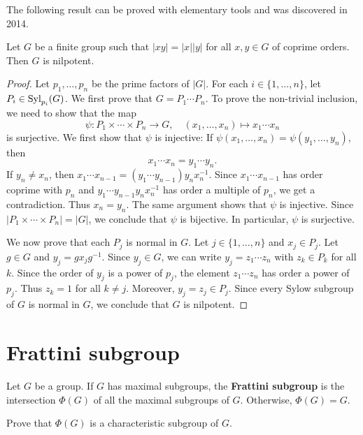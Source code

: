 The following result can be proved with elementary tools 
and was discovered 
in 2014. 

\begin{theorem}
Let $G$ be a finite group such that $|xy|=|x||y|$ for all $x,y\in G$ of coprime orders. 
Then $G$ is nilpotent. 
\end{theorem}

\begin{proof}
Let $p_1,\dots,p_n$ be the prime factors of $|G|$. For 
each 
$i\in\{1,\dots,n\}$, let $P_i\in\mathrm{Syl}_{p_i}(G)$. We first prove that 
$G=P_1\cdots P_n$. To prove the non-trivial inclusion, we need to show that 
the map
\[
	\psi\colon P_1\times\cdots\times P_n\to G,\quad
	(x_1,\dots,x_n)\mapsto x_1\cdots x_n
\]
is surjective. We first show that $\psi$ is injective: If 
$\psi(x_1,\dots,x_n)=\psi(y_1,\dots,y_n)$, then 
\[
x_1\cdots x_n=y_1\cdots y_n. 
\]
If $y_n\ne x_n$, then $x_1\cdots x_{n-1}=(y_1\cdots
y_{n-1})y_nx_n^{-1}$. Since $x_1\cdots x_{n-1}$ has order coprime with 
$p_n$ and $y_1\cdots y_{n-1}y_nx_n^{-1}$ has order a multiple of 
$p_n$, we get a contradiction. Thus  $x_n=y_n$. The same argument shows that 
$\psi$ is injective. Since $|P_1\times\cdots\times
P_n|=|G|$, we conclude that $\psi$ is bijective. In particular, 
$\psi$ is surjective. 

We now prove that each $P_j$ is normal in $G$. Let $j\in\{1,\dots,n\}$ and 
$x_j\in P_j$. Let $g\in G$ and $y_j=gx_jg^{-1}$.  Since $y_j\in G$,
we can write $y_j=z_1\cdots z_n$ with $z_k\in P_k$ for all $k$.  Since
the order of $y_j$ is a power of $p_j$, the element $z_1\cdots
z_n$ has order a power of $p_j$. Thus $z_k=1$ for all $k\ne j$. Moreover, 
$y_j=z_j\in P_j$. Since every Sylow subgroup of $G$ is normal in $G$, 
we conclude that $G$ is nilpotent. 
\end{proof}




\section{Frattini subgroup}

\begin{definition}
Let $G$ be a group. If $G$ has maximal subgroups, 
the \textbf{Frattini subgroup} is the intersection 
$\Phi(G)$ of all the maximal subgroups of $G$. 
Otherwise, 
$\Phi(G)=G$. 
\end{definition}

\begin{exercise}
\label{xca:Phi(G)char}
Prove that $\Phi(G)$ is a characteristic subgroup of $G$. 
\end{exercise}

